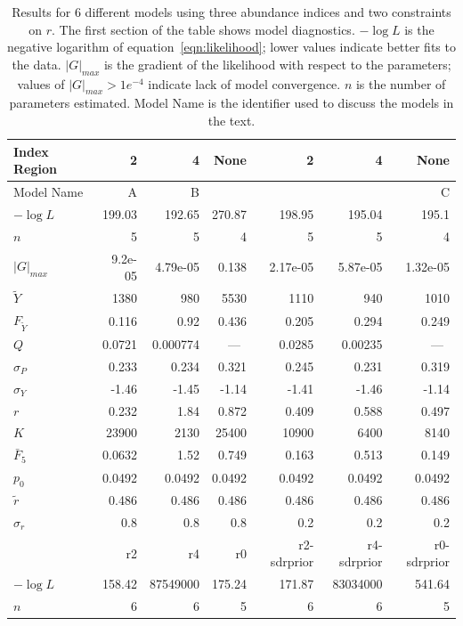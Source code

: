 \documentclass[12pt,letterpaper]{article}
\newcommand\MSY{\widetilde{Y}}
\newcommand\Fmsy{F_{\MSY}}
\begin{document}
\begin{table}
{\small
\caption{Results for 6 different models using three
abundance indices and two constraints on $r$. The first section of the
table shows model diagnostics. $-\log L$ is the negative logarithm of
equation~\ref{eqn:likelihood}; lower values indicate better fits to
the data.
$|G|_{max}$ is the gradient of the likelihood with respect to the
parameters; values of $|G|_{max}>1e^{-4}$ indicate lack of model
convergence.
$n$ is the number of parameters estimated.
Model Name is the identifier used to discuss the models in the
text.
}
\label{tab:ests1}
\begin{center}
\begin{tabular}{|l|rrr|rrr|}
\hline
Index Region  &  2& 4& None& 2& 4& None\\
\hline
Model Name & A    & B   &     &     &     & C\\
\hline
\hline
$-\log L$ & 199.03 & 192.65 & 270.87 & 198.95 & 195.04 & 195.1\\
$n$ & 5 & 5 & 4 & 5 & 5 & 4\\
$|G|_{max}$ & 9.2e-05 & 4.79e-05 & 0.138 & 2.17e-05 & 5.87e-05 & 1.32e-05\\
\hline
$\MSY$ & 1380 & 980 & 5530 & 1110 & 940 & 1010\\
$\Fmsy$ & 0.116 & 0.92 & 0.436 & 0.205 & 0.294 & 0.249\\
$Q$ & 0.0721 & 0.000774 & ~---~ & 0.0285 & 0.00235 & ~---~\\
$\sigma_P$ & 0.233 & 0.234 & 0.321 & 0.245 & 0.231 & 0.319\\
$\sigma_Y$ & -1.46 & -1.45 & -1.14 & -1.41 & -1.46 & -1.14\\
\hline
$r$ & 0.232 & 1.84 & 0.872 & 0.409 & 0.588 & 0.497\\
$K$ & 23900 & 2130 & 25400 & 10900 & 6400 & 8140\\
$\bar{F}_5$ & 0.0632 & 1.52 & 0.749 & 0.163 & 0.513 & 0.149\\
\hline
$p_0$ & 0.0492 & 0.0492 & 0.0492 & 0.0492 & 0.0492 & 0.0492\\
$\tilde{r}$ & 0.486 & 0.486 & 0.486 & 0.486 & 0.486 & 0.486\\
$\sigma_r$ & 0.8 & 0.8 & 0.8 & 0.2 & 0.2 & 0.2\\
\hline
\hline
&r2 & r4 & r0 & r2-sdrprior & r4-sdrprior & r0-sdrprior\\
$-\log L$ & 158.42 & 87549000 & 175.24 & 171.87 & 83034000 & 541.64\\
$n$ & 6 & 6 & 5 & 6 & 6 & 5\\

\end{tabular}
\end{center}}
\end{table}
\end{document}
